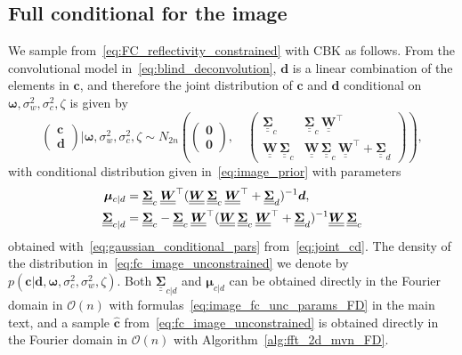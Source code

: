\documentclass[12pt]{article}
\newcommand{\mybcirc}[1] {\underline{\underline{\bm{#1}}}}
\begin{document}
\subsection{Full conditional for the image}\label{ap:fc_refl}
We sample from~\eqref{eq:FC_reflectivity_constrained} with CBK as follows. 
From the convolutional model in~\eqref{eq:blind_deconvolution}, $\bm{d}$ is a linear combination of the elements in $\bm{c}$, and therefore the joint distribution of $\bm{c}$ and $\bm{d}$ conditional on $\bm{\omega}, \sigma_w^2, \sigma_c^2, \zeta$ is given by
\begin{equation} \label{eq:joint_cd}
    \begin{pmatrix} \bm{c} \\ \bm{d}\end{pmatrix} | \bm{\omega}, \sigma_w^2, \sigma_c^2, \zeta 
    \sim N_{2n}(
    \begin{pmatrix} \bm{0} \\ \bm{0}\end{pmatrix}, \quad
    \begin{pmatrix} 
    \mybcirc{\Sigma}_c & \mybcirc{\Sigma}_c \, \mybcirc{W}^{\top}  \\ 
    \mybcirc{W} \, \mybcirc{\Sigma}_c  & \mybcirc{W} \,  \mybcirc{\Sigma}_c \, \mybcirc{W}^{\top}  + \mybcirc{\Sigma}_d
    \end{pmatrix} ),
\end{equation}
with conditional distribution given in~\eqref{eq:image_prior}
with parameters
\begin{align}\label{eq:image_fc_unc_params}
    \bm{\mu}_{c|d} &= \mybcirc{\Sigma}_c \hspace*{0.07cm}\mybcirc{W}^{\top} (\mybcirc{W} \hspace*{0.07cm} \mybcirc{\Sigma}_c \hspace*{0.07cm} \mybcirc{W}^{\top} + \mybcirc{\Sigma}_d)^{-1}\bm{d}, \\
    \mybcirc{\Sigma}_{c|d} &= \mybcirc{\Sigma}_c - \mybcirc{\Sigma}_c\hspace*{0.07cm} \mybcirc{W}^{\top} (\mybcirc{W}\hspace*{0.07cm} \mybcirc{\Sigma}_c\hspace*{0.07cm} \mybcirc{W}^{\top} + \mybcirc{\Sigma}_d)^{-1} \mybcirc{W}\hspace*{0.07cm} \mybcirc{\Sigma}_c
\end{align}
obtained with~\eqref{eq:gaussian_conditional_pars} from~\eqref{eq:joint_cd}. The density of the distribution in~\eqref{eq:fc_image_unconstrained} we denote by $p(\bm{c}| \bm{d}, \bm{\omega}, \sigma_c^2, \sigma_w^2, \zeta)$. 
Both $\mybcirc{\Sigma}_{c|d}$ and $\bm{\mu}_{c|d}$ can be obtained directly in the Fourier domain in $\mathcal{O}(n)$ with formulas~\eqref{eq:image_fc_unc_params_FD} in the main text, 
and a sample $\widehat{\bm{c}}$ from~\eqref{eq:fc_image_unconstrained} is obtained directly in the Fourier domain in $\mathcal{O}(n)$ with Algorithm~\ref{alg:fft_2d_mvn_FD}.
\end{document}

